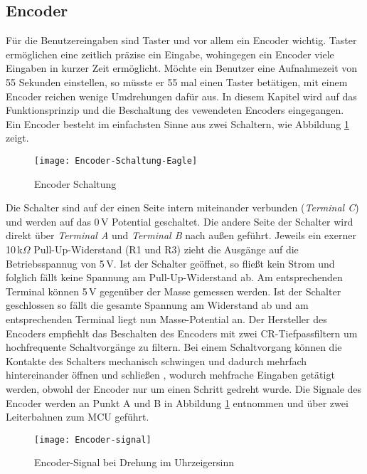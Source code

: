 
\subsection{Encoder}

Für die Benutzereingaben sind Taster und vor allem ein Encoder wichtig. Taster ermöglichen eine zeitlich präzise ein Eingabe, wohingegen ein Encoder viele Eingaben in kurzer Zeit ermöglicht. Möchte ein Benutzer eine Aufnahmezeit von 55 Sekunden einstellen, so müsste er 55 mal einen Taster betätigen, mit einem Encoder reichen wenige Umdrehungen dafür aus. In diesem Kapitel wird auf das Funktionsprinzip und die Beschaltung des vewendeten Encoders eingegangen.\\
Ein Encoder besteht im einfachsten Sinne aus zwei Schaltern, wie Abbildung \ref{fig:Encoder-Schaltung} zeigt. 
\begin{figure}[h]
	\begin{center}
		\texttt{[image: Encoder-Schaltung-Eagle]}
		\caption{Encoder Schaltung \cite{EncoderMN}}
		\label{fig:Encoder-Schaltung}
	\end{center}
\end{figure}
Die Schalter sind auf der einen Seite intern miteinander verbunden (\textit{Terminal C}) und werden auf das 0\,V Potential geschaltet. Die andere Seite der Schalter wird direkt über \textit{Terminal A} und \textit{Terminal B} nach außen geführt. Jeweils ein exerner 10\,k$\Omega$ Pull-Up-Widerstand (R1 und R3) zieht die Ausgänge auf die Betriebsspannug von 5\,V. Ist der Schalter geöffnet, so fließt kein Strom und folglich fällt keine Spannung am Pull-Up-Widerstand ab. Am entsprechenden Terminal können 5\,V gegenüber der Masse gemessen werden. Ist der Schalter geschlossen so fällt die gesamte Spannung am Widerstand ab und am entsprechenden Terminal liegt nun Masse-Potential an. Der Hersteller des Encoders empfiehlt das Beschalten des Encoders mit zwei CR-Tiefpassfiltern um hochfrequente Schaltvorgänge zu filtern. Bei einem Schaltvorgang können die Kontakte des Schalters mechanisch schwingen und dadurch mehrfach hintereinander öffnen und schließen \cite[s. 67]{TechInfo}, wodurch mehfrache Eingaben getätigt werden, obwohl der Encoder nur um einen Schritt gedreht wurde. Die Signale des Encoder werden an Punkt A und B in Abbildung \ref{fig:Encoder-Schaltung} entnommen und über zwei Leiterbahnen zum MCU geführt. %
\begin{figure}[h]
	\texttt{[image: Encoder-signal]}
	\caption{Encoder-Signal bei Drehung im Uhrzeigersinn}
	\label{fig:Encoder-signal}
\end{figure}
